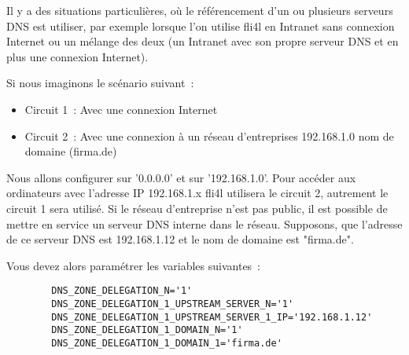 \begin{description}

      {Il y a des situations particulières, où le référencement d'un ou plusieurs
      serveurs DNS est utiliser, par exemple lorsque l'on utilise fli4l en
      Intranet sans connexion Internet ou un mélange des deux (un Intranet avec
      son propre serveur DNS et en plus une connexion Internet).

      Si nous imaginons le scénario suivant~:

      \begin{itemize}
      \item Circuit 1~: Avec une connexion Internet
      \item Circuit 2~: Avec une connexion à un réseau d'entreprises 192.168.1.0
          nom de domaine (firma.de)
      \end{itemize}

      Nous allons configurer  sur '0.0.0.0' et
       sur '192.168.1.0'. Pour accéder aux
      ordinateurs avec l'adresse IP 192.168.1.x fli4l utilisera le circuit 2,
      autrement le circuit 1 sera utilisé. Si le réseau d'entreprise n'est pas
      public, il est possible de mettre en service un serveur DNS interne dans
      le réseau. Supposons, que l'adresse de ce serveur DNS est 192.168.1.12 et
      le nom de domaine est "firma.de".

      Vous devez alors paramétrer les variables suivantes~:

\begin{example}
\begin{verbatim}
        DNS_ZONE_DELEGATION_N='1'
        DNS_ZONE_DELEGATION_1_UPSTREAM_SERVER_N='1'
        DNS_ZONE_DELEGATION_1_UPSTREAM_SERVER_1_IP='192.168.1.12'
        DNS_ZONE_DELEGATION_1_DOMAIN_N='1'
        DNS_ZONE_DELEGATION_1_DOMAIN_1='firma.de'
\end{verbatim}
\end{example}

}
\end{description}
